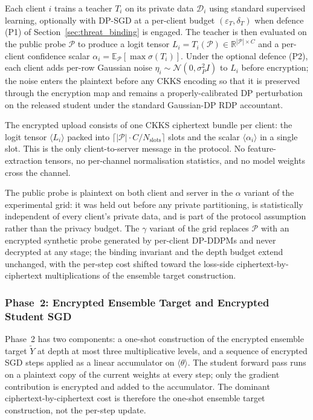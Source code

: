 Each client $i$ trains a teacher $T_i$ on its private data $\mathcal{D}_i$ using standard supervised learning, optionally with DP-SGD at a per-client budget $(\varepsilon_T, \delta_T)$ when defence (P1) of Section~\ref{sec:threat_binding} is engaged. The teacher is then evaluated on the public probe $\mathcal{P}$ to produce a logit tensor $L_i = T_i(\mathcal{P}) \in \mathbb{R}^{|\mathcal{P}|\times C}$ and a per-client confidence scalar $\alpha_i = \mathbb{E}_{\mathcal{P}}[\max \sigma(T_i)]$. Under the optional defence (P2), each client adds per-row Gaussian noise $\eta_i \sim \mathcal N(0, \sigma_P^2 I)$ to $L_i$ before encryption; the noise enters the plaintext before any CKKS encoding so that it is preserved through the encryption map and remains a properly-calibrated DP perturbation on the released student under the standard Gaussian-DP RDP accountant.

The encrypted upload consists of one CKKS ciphertext bundle per client: the logit tensor $\langle L_i\rangle$ packed into $\lceil |\mathcal{P}|\cdot C / N_{\text{slots}}\rceil$ slots and the scalar $\langle\alpha_i\rangle$ in a single slot. This is the only client-to-server message in the protocol. No feature-extraction tensors, no per-channel normalisation statistics, and no model weights cross the channel.

The public probe is plaintext on both client and server in the $\alpha$ variant of the experimental grid: it was held out before any private partitioning, is statistically independent of every client's private data, and is part of the protocol assumption rather than the privacy budget. The $\gamma$ variant of the grid replaces $\mathcal{P}$ with an encrypted synthetic probe generated by per-client DP-DDPMs and never decrypted at any stage; the binding invariant and the depth budget extend unchanged, with the per-step cost shifted toward the loss-side ciphertext-by-ciphertext multiplications of the ensemble target construction.


\subsubsection{Phase~2: Encrypted Ensemble Target and Encrypted Student SGD}
\label{sec:phase2}

Phase~2 has two components: a one-shot construction of the encrypted ensemble target $\widetilde Y$ at depth at most three multiplicative levels, and a sequence of encrypted SGD steps applied as a linear accumulator on $\langle\theta\rangle$. The student forward pass runs on a plaintext copy of the current weights at every step; only the gradient contribution is encrypted and added to the accumulator. The dominant ciphertext-by-ciphertext cost is therefore the one-shot ensemble target construction, not the per-step update.

